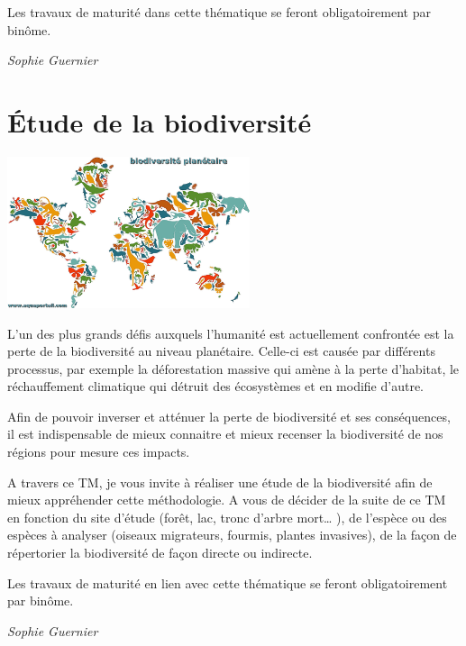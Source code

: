 \documentclass[
  10pt,
  french,
  a5paper,
  openany]{book}
\newenvironment{signature}{\begin{flushright}}{\end{flushright}}
\begin{document}
Les travaux de maturité dans cette thématique se feront obligatoirement par binôme.

\begin{signature}
\emph{Sophie Guernier}

\end{signature}

\hypertarget{uxe9tude-de-la-biodiversituxe9}{%
\chapter{Étude de la biodiversité}\label{uxe9tude-de-la-biodiversituxe9}}

\begin{center}
\includegraphics[width=\textwidth,height=12em]{images/etude-de-la-biodiversite.jpg}

\end{center}

L'un des plus grands défis auxquels l'humanité est actuellement confrontée est la perte de la biodiversité au niveau planétaire. Celle-ci est causée par différents processus, par exemple la déforestation massive qui amène à la perte d'habitat, le réchauffement climatique qui détruit des écosystèmes et en modifie d'autre.

Afin de pouvoir inverser et atténuer la perte de biodiversité et ses conséquences, il est indispensable de mieux connaitre et mieux recenser la biodiversité de nos régions pour mesure ces impacts.

A travers ce TM, je vous invite à réaliser une étude de la biodiversité afin de mieux appréhender cette méthodologie. A vous de décider de la suite de ce TM en fonction du site d'étude (forêt, lac, tronc d'arbre mort\ldots{} ), de l'espèce ou des espèces à analyser (oiseaux migrateurs, fourmis, plantes invasives), de la façon de répertorier la biodiversité de façon directe ou indirecte.

Les travaux de maturité en lien avec cette thématique se feront obligatoirement par binôme.

\begin{signature}
\emph{Sophie Guernier}

\end{signature}
\end{document}
